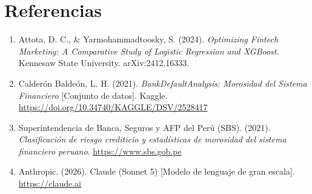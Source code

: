 \documentclass[11pt]{article}
\begin{document}
\section*{Referencias}

\begin{enumerate}[leftmargin=1.6em]
\item Attota, D. C., \& Yarmohammadtoosky, S. (2024). \textit{Optimizing Fintech Marketing: A Comparative Study of Logistic Regression and XGBoost}. Kennesaw State University. arXiv:2412.16333.
\item Calderón Baldeón, L. H. (2021). \textit{BankDefaultAnalysis: Morosidad del Sistema Financiero} [Conjunto de datos]. Kaggle. \url{https://doi.org/10.34740/KAGGLE/DSV/2528417}
\item Superintendencia de Banca, Seguros y AFP del Perú (SBS). (2021). \textit{Clasificación de riesgo crediticio y estadísticas de morosidad del sistema financiero peruano}. \url{https://www.sbs.gob.pe}
\item Anthropic. (2026). Claude (Sonnet 5) [Modelo de lenguaje de gran escala]. \url{https://claude.ai}
\end{enumerate}
\end{document}
